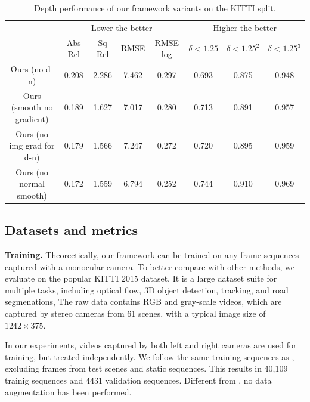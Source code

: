\begin{table}[t]
\centering
\caption{Depth performance of our framework variants on the KITTI split.}
\label{tbl:ablation}
\fontsize{8}{9}\selectfont
\bgroup
\def\arraystretch{1.2}
\begin{tabular}{c|c|c|c|c|c|c|c}
\thickhline
\multirow{2}{*}{Methods}  & \multicolumn{4}{c|}{Lower the better} & \multicolumn{3}{c}{Higher the better}                  \\ \cline{2-8} 
                          & Abs Rel  & Sq Rel  & RMSE  & RMSE log & $\delta < 1.25$ & $\delta < 1.25^2$ & $\delta < 1.25^3$ \\ \hline
Ours (no d-n)             & 0.208    & 2.286   & 7.462 & 0.297    & 0.693           & 0.875             & 0.948             \\
Ours (smooth no gradient) & 0.189    & 1.627   & 7.017 & 0.280    & 0.713           & 0.891             & 0.957             \\
Ours (no img grad for d-n)    & 0.179    & 1.566   & 7.247 & 0.272    & 0.720           & 0.895             & 0.959             \\
Ours (no normal smooth)   & 0.172    & 1.559   & 6.794 & 0.252    & 0.744           & 0.910             & 0.969             \\ \hline
\end{tabular}
\egroup
\vspace{-0.7\baselineskip}
\end{table}

\vspace{-0.5\baselineskip}
\subsection{Datasets and metrics}
\vspace{-0.3\baselineskip}
\textbf{Training.}
Theorectically, our framework can be trained on any frame sequences captured with a monocular camera. To better compare with other methods, we evaluate on the popular KITTI 2015 \cite{geiger2012we} dataset. It is a large dataset suite for multiple tasks, including optical flow, 3D object detection, tracking, and road segmenations, \etc The raw data contains RGB and gray-scale videos, which are captured by stereo cameras from 61 scenes, with a typical image size of $1242 \times 375$.

In our experiments, videos captured by both left and right cameras are used for training, but treated independently. We follow the same training sequences as \cite{zhou2017unsupervised,eigen2014depth}, excluding frames from test scenes and static sequences. This results in 40,109 trainig sequences and 4431 validation sequences. Different from \cite{godard2016unsupervised}, no data augmentation has been performed.

